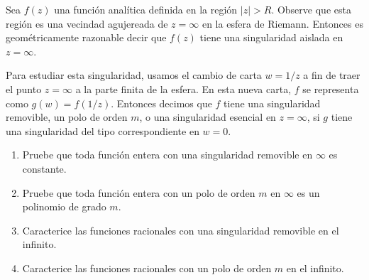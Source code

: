 \begin{exercise}
Sea $f(z)$ una función analítica definida en la región $|z| > R$. Observe que esta región es una vecindad agujereada de $z = \infty$ en la esfera de Riemann. Entonces es geométricamente razonable decir que $f(z)$ tiene una singularidad aislada en $z = \infty$.

Para estudiar esta singularidad, usamos el cambio de carta $w = 1/z$ a fin de traer el punto $z = \infty$ a la parte finita de la esfera. En esta nueva carta, $f$ se representa como $g(w) = f(1/z)$. Entonces decimos que $f$ tiene una singularidad removible, un polo de orden $m$, o una singularidad esencial en $z = \infty$, si $g$ tiene una singularidad del tipo correspondiente en $w = 0$.
\begin{enumerate}[label=(\alph*)]
    \item Pruebe que toda función entera con una singularidad removible en $\infty$ es constante.
    \item Pruebe que toda función entera con un polo de orden $m$ en $\infty$ es un polinomio de grado $m$.
    \item Caracterice las funciones racionales con una singularidad removible en el infinito.
    \item Caracterice las funciones racionales con un polo de orden $m$ en el infinito.
\end{enumerate}
\end{exercise}


